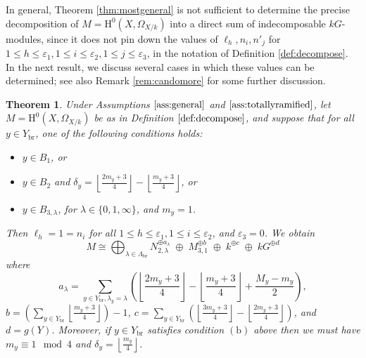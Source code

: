 \documentclass{amsart}
\numberwithin{equation}{section}
\numberwithin{table}{section}
\theoremstyle{plain}
\newtheorem{theorem}{Theorem}[section]
\theoremstyle{definition}
\theoremstyle{remark}
\newcommand{\HH}{\mathrm{H}}
\begin{document}
In general, Theorem \ref{thm:mostgeneral} is not sufficient to determine the precise decomposition of $M=\HH^0(X,\Omega_{X/k})$ into a direct sum of indecomposable $kG$-modules, since it does not pin down the values of $\ell_h,n_i,n'_j$ for $1\le h \le \varepsilon_1,1\le i\le \varepsilon_2,1\le j\le \varepsilon_3$, in the notation of Definition \ref{def:decompose}. In the next result, we discuss several cases in which these values can be determined; see also Remark \ref{rem:candomore} for some further discussion.

\begin{theorem}
\label{thm:onlyB1orB2B3small}
Under Assumptions $\ref{ass:general}$ and $\ref{ass:totallyramified}$, let $M=\HH^0(X,\Omega_{X/k})$ be as in Definition $\ref{def:decompose}$, and suppose 
that for all $y\in Y_{\mathrm{br}}$, one of the following conditions holds:
\begin{itemize}
\item[(a)] $y\in B_1$, or
\item[(b)] $y\in B_2$ and $\delta_y=\left\lfloor \frac{2m_y+3}{4}\right\rfloor - \left\lfloor \frac{m_y+3}{4}\right\rfloor$, or
\item[(c)] $y\in B_{3,\lambda}$, for $\lambda\in\{0,1,\infty\}$, and $m_y=1$.
\end{itemize}
Then $\ell_h=1=n_i$ for all $1\le h \le \varepsilon_1,1\le i\le \varepsilon_2$, and $\varepsilon_3=0$. We obtain 
$$M\cong \bigoplus_{\lambda\in \Lambda_{\mathrm{br}}} N_{2,\lambda}^{\oplus a_\lambda}\; \oplus\; M_{3,1}^{\oplus b} \;\oplus\; k^{\oplus c} \;\oplus\; kG^{\oplus d}$$
where 
$$a_\lambda = \sum_{y\in Y_{\mathrm{br}},\lambda_y=\lambda}\left(\textstyle{\left\lfloor \frac{2m_y+3}{4}\right\rfloor} - \textstyle{\left\lfloor \frac{m_y+3}{4}\right\rfloor}+\textstyle{\frac{M_y-m_y}{2}} \right),$$
$b= \left(\sum_{y\in Y_{\mathrm{br}}} \left\lfloor \frac{m_y+3}{4}\right\rfloor\right)-1$, $c= \sum_{y\in Y_{\mathrm{br}}} \left(\left\lfloor \frac{3m_y+3}{4}\right\rfloor - \left\lfloor \frac{2m_y+3}{4}\right\rfloor\right)$, and $d=g(Y)$. Moreover, if $y\in Y_{\mathrm{br}}$ satisfies condition $(\mathrm{b})$ above then we must have $m_y\equiv 1\mod 4$ and $\delta_y=\left\lfloor \frac{m_y}{4}\right\rfloor$.
\end{theorem}
\end{document}
